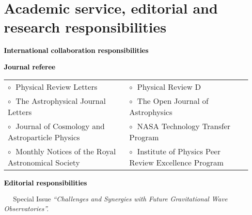 \vspace{-0.1cm}

\vspace{0.2cm}

\section{Academic service, editorial and research responsibilities}

\textbf{\textcolor{black}{International collaboration responsibilities}}
\vspace{0.1cm}



\textbf{\textcolor{black}{Journal referee}}
\vspace{0.1cm}

\begin{tabular}{@{\hskip 0.4cm}l@{\hskip 0.4in}l}
$\circ\;$ Physical Review Letters & $\circ\;$ Physical Review D \\
$\circ\;$  The Astrophysical Journal Letters  &  $\circ\;$  The Open Journal of Astrophysics  \\
$\circ\;$  Journal of Cosmology and Astroparticle Physics & $\circ\;$ NASA Technology Transfer Program \\
$\circ\;$  Monthly Notices of the Royal Astronomical Society& $\circ\;$ Institute of Physics Peer Review Excellence Program \\
\end{tabular}

\vspace{0.2cm}
\textbf{\textcolor{black}{Editorial responsibilities}}
\vspace{0.1cm}

\vspace{-0.1cm}
\hspace{0.4cm}$\phantom{\circ}\;$ Special Issue \textit{``Challenges and Synergies with Future Gravitational Wave Observatories''.}\vspace{0.1cm}

\vspace{-0.1cm}

